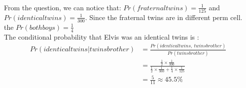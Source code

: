 \documentclass[11pt]{article}
\begin{document}
  \paragraph{\color{red}{Question Two Answer:}}
  From the question, we can notice that: $Pr(fraternal twins) = \frac{1}{125}$ and $Pr(identical twins) = \frac{1}{300}$. Since the fraternal twins are in different perm cell. the $Pr(both boys) = \frac{1}{4}$\\
  The conditional probability that Elvis was an identical twins is :
  \begin{align*}
    Pr(identical twins | twins brother) &= \frac{Pr(identical twins, \ twins brother)}{Pr(twins brother)} \\
    &= \frac{\frac{1}{2} \times \frac{1}{300}}{\frac{1}{2} \times \frac{1}{300} + \frac{1}{4}\times \frac{1}{125}} \\
    &= \frac{5}{11} \approx 45.5\%
  \end{align*}
  \paragraph{\color{red}{Question Three Answer:}}
\end{document}
